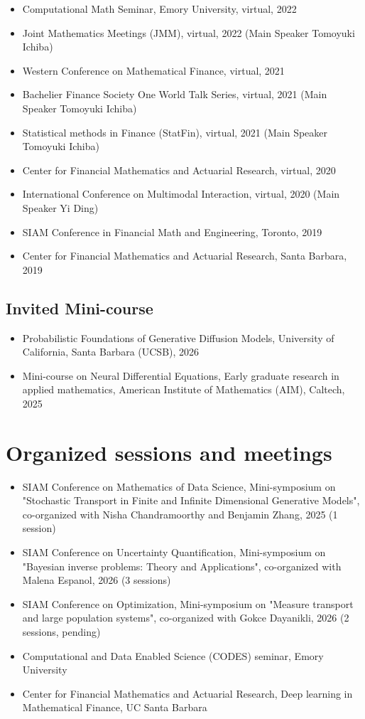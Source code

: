 \documentclass[11pt,a4paper,roman]{moderncv}
\begin{document}
\begin{itemize}
\item Computational Math Seminar, Emory University, virtual, 2022
\item Joint Mathematics Meetings (JMM), virtual, 2022 (Main Speaker Tomoyuki Ichiba)
\item Western Conference on Mathematical Finance, virtual, 2021
\item Bachelier Finance Society One World Talk Series, virtual, 2021 (Main Speaker Tomoyuki Ichiba)
\item Statistical methods in Finance (StatFin), virtual, 2021 (Main Speaker Tomoyuki Ichiba)
\item Center for Financial Mathematics and Actuarial Research, virtual, 2020
\item International Conference on Multimodal Interaction, virtual, 2020 (Main Speaker Yi Ding)
\item SIAM Conference in Financial Math and Engineering, Toronto, 2019
\item Center for Financial Mathematics and Actuarial Research, Santa Barbara, 2019
\end{itemize}
\subsection{\textbf{Invited Mini-course}}
\begin{itemize}
\item Probabilistic Foundations of Generative Diffusion Models, University of California, Santa Barbara (UCSB), 2026
\item Mini-course on Neural Differential Equations, Early graduate research in applied mathematics, American Institute of Mathematics (AIM), Caltech, 2025
\end{itemize}

\section{Organized sessions and meetings}
\begin{itemize}
\item SIAM Conference on Mathematics of Data Science, Mini-symposium on "Stochastic Transport in Finite and Infinite Dimensional Generative Models", co-organized with Nisha Chandramoorthy and Benjamin Zhang, 2025 (1 session)
\item SIAM Conference on Uncertainty Quantification, Mini-symposium on "Bayesian inverse problems: Theory and Applications", co-organized with Malena Espanol, 2026 (3 sessions)
\item SIAM Conference on Optimization, Mini-symposium on "Measure transport and large population systems", co-organized with Gokce Dayanikli, 2026 (2 sessions, pending)
    \item Computational and Data Enabled Science (CODES) seminar, Emory University
    \item Center for Financial Mathematics and Actuarial Research, Deep learning in Mathematical Finance, UC Santa Barbara
\end{itemize}
\end{document}
